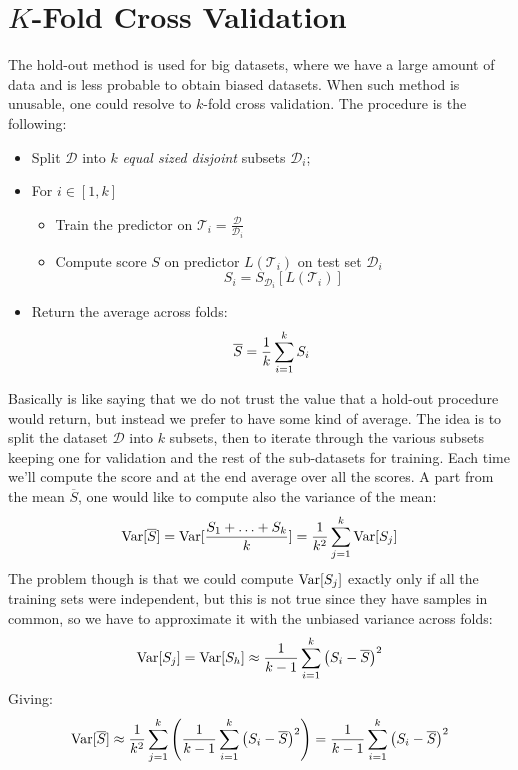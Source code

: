 \section{$K$-Fold Cross Validation}
The hold-out method is used for big datasets, where we have a large amount of data and is less probable to obtain biased datasets. \newline
When such method is unusable, one could resolve to $k$-fold cross validation. The procedure is the following:
\begin{itemize}
  \item Split $\mathcal{D}$ into $k$ \textit{equal sized disjoint} subsets $\mathcal{D}_i$;
  \item For $i\in[1,k]$
    \begin{itemize}
      \item Train the predictor on $\mathcal{T}_i=\frac{\mathcal{D}}{\mathcal{D}_i}$
      \item Compute score $S$ on predictor $L(\mathcal{T}_i)$ on test set $\mathcal{D}_i$
        \[S_i=S_{\mathcal{D}_i}[L(\mathcal{T}_i)]\]
    \end{itemize}
  \item Return the average across folds:
    \[\overline{S}=\frac{1}{k}\displaystyle\sum_{i=1}^kS_i\]
\end{itemize}
Basically is like saying that we do not trust the value that a hold-out procedure would return, but instead we prefer to have some kind of average. \newline
The idea is to split the dataset $\mathcal{D}$ into $k$ subsets, then to iterate through the various subsets keeping one for validation and the rest of the sub-datasets for training. Each time we'll compute the score and at the end average over all the scores. \newline
A part from the mean $\overline{S}$, one would like to compute also the variance of the mean:
\[\text{Var}[\overline{S}]=\text{Var}[\frac{S_1+\hdots+S_k}{k}]=\frac{1}{k^2}\displaystyle\sum_{j=1}^k\text{Var}[S_j]\]
The problem though is that we could compute $\text{Var}[S_j]$ exactly only if all the training sets were independent, but this is not true since they have samples in common, so we have to approximate it with the unbiased variance across folds:
\[\text{Var}[S_j]=\text{Var}[S_h]\approx\frac{1}{k-1}\displaystyle\sum_{i=1}^k\left(S_i-\overline{S}\right)^2\]
Giving:
\[\text{Var}[\overline{S}]\approx\frac{1}{k^2}\displaystyle\sum_{j=1}^k\left(\frac{1}{k-1}\displaystyle\sum_{i=1}^k\left(S_i-\overline{S}\right)^2\right)=\frac{1}{k-1}\displaystyle\sum_{i=1}^k\left(S_i-\overline{S}\right)^2\]
%
%
%
